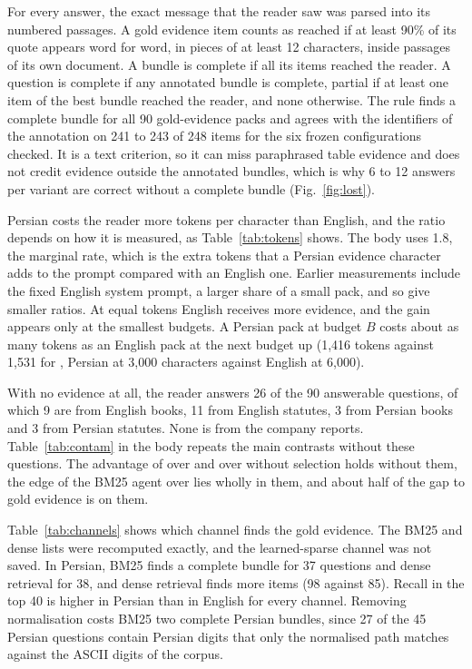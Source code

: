 For every answer, the exact message that the reader saw was parsed into its numbered passages.
A gold evidence item counts as reached if at least 90\% of its quote appears word for word, in pieces of at least 12 characters, inside passages of its own document.
A bundle is complete if all its items reached the reader.
A question is complete if any annotated bundle is complete, partial if at least one item of the best bundle reached the reader, and none otherwise.
The rule finds a complete bundle for all 90 gold-evidence packs and agrees with the identifiers of the annotation on 241 to 243 of 248 items for the six frozen configurations checked.
It is a text criterion, so it can miss paraphrased table evidence and does not credit evidence outside the annotated bundles, which is why 6 to 12 answers per variant are correct without a complete bundle (Fig.~\ref{fig:lost}).

Persian costs the reader more tokens per character than English, and the ratio depends on how it is measured, as Table~\ref{tab:tokens} shows.
The body uses 1.8, the marginal rate, which is the extra tokens that a Persian evidence character adds to the prompt compared with an English one.
Earlier measurements include the fixed English system prompt, a larger share of a small pack, and so give smaller ratios.
At equal tokens English receives more evidence, and the gain appears only at the smallest budgets.
A Persian pack at budget $B$ costs about as many tokens as an English pack at the next budget up (1,416 tokens against 1,531 for \hybrid{}, Persian at 3,000 characters against English at 6,000).


With no evidence at all, the reader answers 26 of the 90 answerable questions, of which 9 are from English books, 11 from English statutes, 3 from Persian books and 3 from Persian statutes. None is from the company reports.
Table~\ref{tab:contam} in the body repeats the main contrasts without these questions.
The advantage of \lexb{} over \hybrid{} and over \lexb{} without selection holds without them, the edge of the BM25 agent over \hr{} lies wholly in them, and about half of the gap to gold evidence is on them.

Table~\ref{tab:channels} shows which channel finds the gold evidence.
The BM25 and dense lists were recomputed exactly, and the learned-sparse channel was not saved.
In Persian, BM25 finds a complete bundle for 37 questions and dense retrieval for 38, and dense retrieval finds more items (98 against 85).
Recall in the top 40 is higher in Persian than in English for every channel.
Removing normalisation costs BM25 two complete Persian bundles, since 27 of the 45 Persian questions contain Persian digits that only the normalised path matches against the ASCII digits of the corpus.


